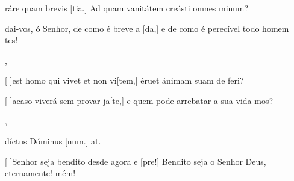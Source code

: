 {  {\item {}ráre quam brevis [tia.] Ad quam vanitátem creásti omnes minum?~\Antiphona}%
    {\item {}dai-vos, ó Senhor, de como é breve a [da,] e de como é perecível todo homem \-tes!~\Antiphona},
  {\item {}[ ]{est} homo qui vivet et non vi[tem,] éruet ánimam suam de feri?~\Antiphona}%
    {\item {}[ ]{a}caso viverá sem provar ja[te,] e quem pode arrebatar a sua vida mos?~\Antiphona},
  {\item {}díctus Dóminus [num.] at.~\Antiphona}%
    {\item {}[ ]{Se}nhor seja bendito desde agora e [pre!] Bendito seja o Senhor Deus, eternamente! mém!~\Antiphona}
}